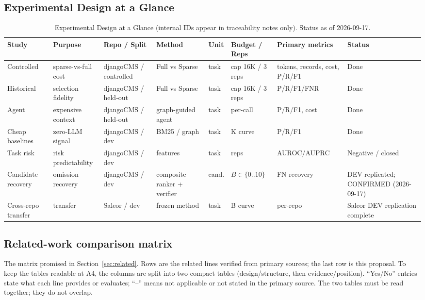 \documentclass[11pt,a4paper]{article}
\begin{document}
\subsection{Experimental Design at a Glance}
\begin{table}[h]
\centering
\small
\renewcommand{\arraystretch}{1.3}
\setlength{\tabcolsep}{3pt}
\begin{tabularx}{\textwidth}{@{}>{\raggedright\arraybackslash}p{1.7cm}>{\raggedright\arraybackslash}p{1.8cm}>{\raggedright\arraybackslash}p{1.8cm}>{\raggedright\arraybackslash}X>{\raggedright\arraybackslash}p{1.1cm}>{\raggedright\arraybackslash}p{1.6cm}>{\raggedright\arraybackslash}X>{\raggedright\arraybackslash}X@{}}
\toprule
Study & Purpose & Repo / Split & Method & Unit & Budget / Reps & Primary metrics & Status \\
\midrule
Controlled & sparse-vs-full cost & djangoCMS / controlled & Full vs Sparse & task & cap 16K / 3 reps & tokens, records, cost, P/R/F1 & Done \\
Historical & selection fidelity & djangoCMS / held-out & Full vs Sparse & task & cap 16K / 3 reps & P/R/F1/FNR & Done \\
Agent & expensive context & djangoCMS / held-out & graph-guided agent & task & per-call & P/R/F1, cost & Done \\
Cheap baselines & zero-LLM signal & djangoCMS / dev & BM25 / graph & task & K curve & P/R/F1 & Done \\
Task risk & risk predictability & djangoCMS / dev & features & task & 3 reps & AUROC\slash AUPRC & Negative / closed \\
Candidate recovery & omission recovery & djangoCMS / dev & composite ranker + verifier & cand. & $B\in\{0..10\}$ & FN-recovery & DEV replicated; CONFIRMED (2026-09-17) \\
Cross-repo transfer & transfer & Saleor / dev & frozen method & task & B curve & per-repo & Saleor DEV replication complete \\
\bottomrule
\end{tabularx}
\caption{Experimental Design at a Glance (internal IDs appear in traceability notes only). Status as of 2026-09-17.}
\end{table}

\subsection{Related-work comparison matrix}
The matrix promised in Section~\ref{sec:related}. Rows are the related lines
verified from primary sources; the last row is this proposal. To keep the
tables readable at A4, the columns are split into two compact tables
(design/structure, then evidence/position). ``Yes/No'' entries state what each
line provides or evaluates; ``--'' means not applicable or not stated in the
primary source. The two tables must be read together; they do not overlap.
\end{document}
